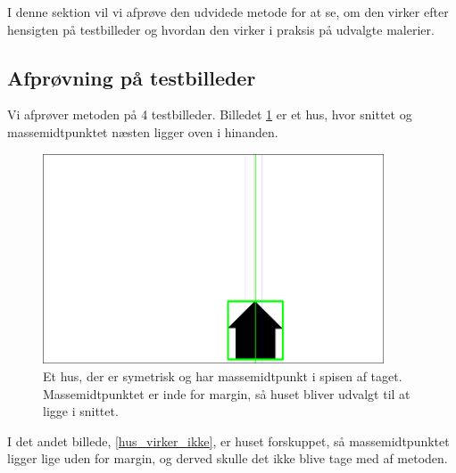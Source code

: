 {\sffamily
I denne sektion vil vi afprøve den udvidede metode for at se, om den
virker efter hensigten på testbilleder og hvordan den virker i praksis
på udvalgte malerier.
}
\subsection{Afprøvning på testbilleder}
Vi afprøver metoden på 4 testbilleder. Billedet \ref{hus_virker} er et hus,
hvor snittet og massemidtpunktet næsten ligger oven i hinanden. 

\begin{figure}[h!!]
	\begin{center}
		\includegraphics[angle=0,width=0.9\textwidth]{afsnit/afprovning/billeder/udvidet_losning/udvidet_hus1_test.png}
	\end{center}
	\caption[]{Et hus, der er symetrisk og har massemidtpunkt i spisen
	af taget. Massemidtpunktet er inde for margin, så huset bliver
	udvalgt til at ligge i snittet.}
	\label{hus_virker}
\end{figure}

I det andet billede, \ref{hus_virker_ikke}, er huset forskuppet, så massemidtpunktet ligger lige uden for margin, og derved skulle det ikke blive tage
med af metoden. 

